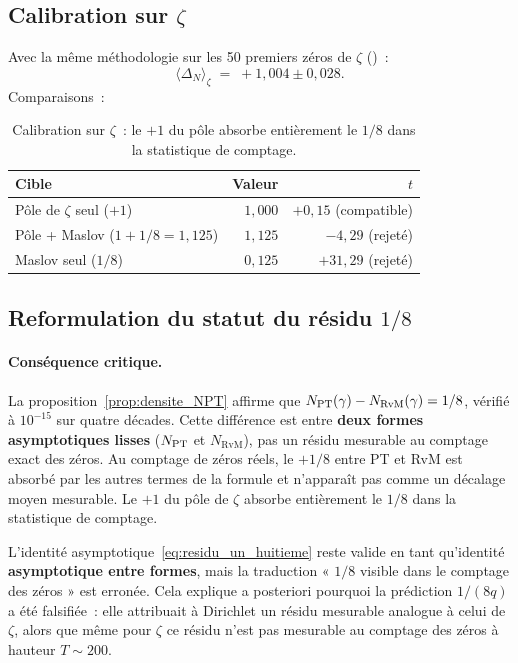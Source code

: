 \subsection{Calibration sur $\zeta$}
\label{sec:calibration_zeta}

Avec la même méthodologie sur les 50 premiers zéros de $\zeta$
(\cite{Odlyzko1992})~:
\begin{equation}
\langle \Delta_N \rangle_\zeta \;=\; +1{,}004 \pm 0{,}028.
\label{eq:calib_zeta}
\end{equation}
Comparaisons~:

\begin{table}[ht]
\centering
\begin{tabular}{@{}lrr@{}}
\toprule
\textbf{Cible} & \textbf{Valeur} & $t$\\
\midrule
Pôle de $\zeta$ seul ($+1$) & $1{,}000$ & $+0{,}15$ (compatible)\\
Pôle + Maslov ($1 + 1/8 = 1{,}125$) & $1{,}125$ & $-4{,}29$ (rejeté)\\
Maslov seul ($1/8$) & $0{,}125$ & $+31{,}29$ (rejeté)\\
\bottomrule
\end{tabular}
\caption{Calibration sur $\zeta$~: le $+1$ du pôle absorbe entièrement le
$1/8$ dans la statistique de comptage.}
\label{tab:calibration_zeta}
\end{table}

\subsection{Reformulation du statut du résidu $1/8$}
\label{sec:reformulation_residu}

\paragraph{Conséquence critique.}
La proposition~\ref{prop:densite_NPT} affirme que
$N_{\mathrm{PT}}(\gamma) - N_{\mathrm{RvM}}(\gamma) = 1/8$, vérifié à $10^{-15}$ sur
quatre décades. Cette différence est entre \textbf{deux formes
asymptotiques lisses} ($N_{\mathrm{PT}}$ et $N_{\mathrm{RvM}}$), pas un résidu
mesurable au comptage exact des zéros. Au comptage de zéros réels, le
$+1/8$ entre PT et RvM est absorbé par les autres termes de la formule
et n'apparaît pas comme un décalage moyen mesurable. Le $+1$ du pôle de
$\zeta$ absorbe entièrement le $1/8$ dans la statistique de comptage.

L'identité asymptotique~\eqref{eq:residu_un_huitieme} reste valide en
tant qu'identité \textbf{asymptotique entre formes}, mais la traduction
« $1/8$ visible dans le comptage des zéros » est erronée. Cela explique
a posteriori pourquoi la prédiction $1/(8q)$ a été falsifiée~: elle
attribuait à Dirichlet un résidu mesurable analogue à celui de $\zeta$,
alors que même pour $\zeta$ ce résidu n'est pas mesurable au comptage des
zéros à hauteur $T \sim 200$.

